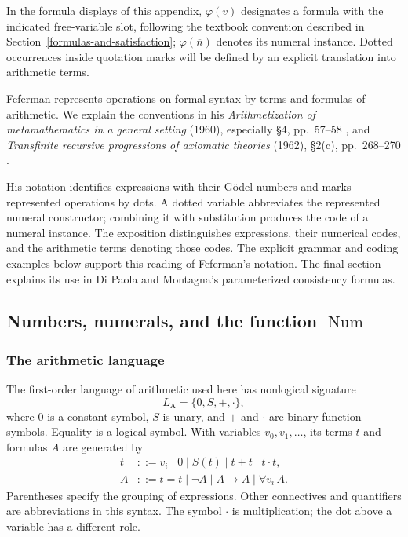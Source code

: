 \documentclass[11pt]{article}
\newcommand{\LA}{L_{\mathrm A}}
\newcommand{\Num}{\operatorname{Num}}
\newcommand{\bn}[1]{\overline{#1}}
\theoremstyle{definition}
\begin{document}
In the formula displays of this appendix, $\varphi(v)$ designates a formula
with the indicated free-variable slot, following the textbook convention
described in Section~\ref{formulas-and-satisfaction}; $\varphi(\bn n)$
denotes its numeral instance. Dotted occurrences inside quotation marks
will be defined by an explicit translation into arithmetic terms.

Feferman represents operations on formal syntax by terms and formulas
of arithmetic. We explain the conventions in his \emph{Arithmetization
of metamathematics in a general setting} (1960), especially \S4,
pp.~57--58 \cite{F60}, and \emph{Transfinite recursive progressions of
axiomatic theories} (1962), \S2(c), pp.~268--270 \cite{F62}.

His notation identifies expressions with their G\"odel numbers and
marks represented operations by dots. A dotted variable abbreviates
the represented numeral constructor; combining it with substitution
produces the code of a numeral instance. The exposition distinguishes
expressions, their numerical codes, and the arithmetic terms denoting
those codes. The explicit grammar and coding examples below support
this reading of Feferman's notation. The final section explains its
use in Di Paola and Montagna's parameterized consistency formulas.

\subsection{Numbers, numerals, and the function \texorpdfstring{$\Num$}{Num}}\label{app:numerals}

\subsubsection*{The arithmetic language}
The first-order language of arithmetic used here has nonlogical signature
\[
 \LA=\{0,S,+,\cdot\},
\]
where $0$ is a constant symbol, $S$ is unary, and $+$ and $\cdot$
are binary function symbols. Equality is a logical symbol. With variables
$v_0,v_1,\ldots$, its terms $t$ and formulas $A$ are generated by
\begin{align*}
 t&::=v_i\mid0\mid S(t)\mid t+t\mid t\cdot t,\\
 A&::=t=t\mid\neg A\mid A\to A\mid\forall v_i\,A.
\end{align*}
Parentheses specify the grouping of expressions. Other connectives and
quantifiers are abbreviations in this syntax. The symbol $\cdot$ is
multiplication; the dot above a variable has a different role.
\end{document}
